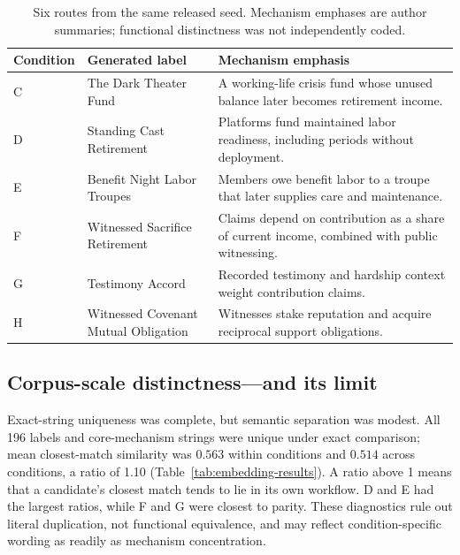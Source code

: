 \documentclass[11pt,a4paper]{article}
\begin{document}
\begin{table}[htbp]
\centering
\footnotesize
\begin{tabularx}{\textwidth}{l>{\raggedright\arraybackslash}p{37mm}X}
\toprule
\textbf{Condition} & \textbf{Generated label} & \textbf{Mechanism emphasis} \\
\midrule
C & The Dark Theater Fund & A working-life crisis fund whose unused balance later becomes retirement income. \\
D & Standing Cast Retirement & Platforms fund maintained labor readiness, including periods without deployment. \\
E & Benefit Night Labor Troupes & Members owe benefit labor to a troupe that later supplies care and maintenance. \\
F & Witnessed Sacrifice Retirement & Claims depend on contribution as a share of current income, combined with public witnessing. \\
G & Testimony Accord & Recorded testimony and hardship context weight contribution claims. \\
H & Witnessed Covenant Mutual Obligation & Witnesses stake reputation and acquire reciprocal support obligations. \\
\bottomrule
\end{tabularx}
\caption{Six routes from the same released seed. Mechanism emphases are author summaries; functional distinctness was not independently coded.}
\label{tab:theatrical}
\end{table}

\subsection{Corpus-scale distinctness---and its limit}

Exact-string uniqueness was complete, but semantic separation was modest. All 196 labels and core-mechanism strings were unique under exact comparison; mean closest-match similarity was $0.563$ within conditions and $0.514$ across conditions, a ratio of 1.10 (Table~\ref{tab:embedding-results}). A ratio above 1 means that a candidate's closest match tends to lie in its own workflow. D and E had the largest ratios, while F and G were closest to parity. These diagnostics rule out literal duplication, not functional equivalence, and may reflect condition-specific wording as readily as mechanism concentration.
\end{document}

